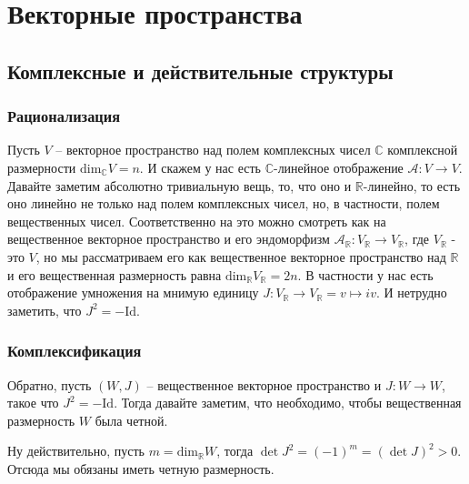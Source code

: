 \chapter{Векторные пространства}
\section{Комплексные и действительные структуры}
\subsection{Рационализация}
Пусть $V$ – векторное пространство над полем комплексных чисел $\mathbb C$
комплексной размерности $\text{dim}_{\mathbb C} V=n$. И
скажем у нас есть $\mathbb C$-линейное отображение $\mathcal A:V\rightarrow V$.
Давайте заметим абсолютно тривиальную вещь, то, что оно и $\mathbb R$-линейно,
то есть оно линейно не только над полем комплексных чисел, но, в частности,
полем вещественных чисел. Соответственно на это можно смотреть как на
вещественное векторное пространство и его эндоморфизм $\mathcal A_{\mathbb R}:
V_{\mathbb R}\rightarrow V_{\mathbb R}$, где $V_{\mathbb R}$ - это $V$, но мы
рассматриваем его как вещественное векторное пространство над $\mathbb R$ и
его вещественная размерность равна $\text{dim}_{\mathbb R} V_{\mathbb R} = 2n$. В
частности у нас есть отображение умножения на мнимую единицу $J:V_{\mathbb R}
\rightarrow V_{\mathbb R}=v\mapsto iv$. И нетрудно заметить, что $J^2=-\text{Id}$.

\subsection{Комплексификация}
Обратно, пусть $(W,J)$ – вещественное векторное пространство и $J:W\rightarrow
W$, такое что $J^2=-\text{Id}$. Тогда давайте заметим, что необходимо, чтобы 
вещественная размерность $W$ была четной.

Ну действительно, пусть $m=\text{dim}_{\mathbb R} W$, тогда $\det J^2=(-1)^m=
(\det J)^2>0$. Отсюда мы обязаны иметь четную размерность.

